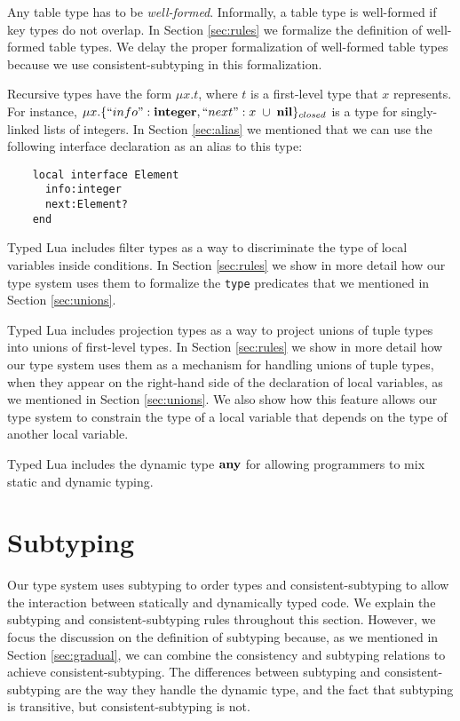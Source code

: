 Any table type has to be \emph{well-formed}.
Informally, a table type is well-formed if key types do not overlap.
In Section \ref{sec:rules} we formalize the definition of well-formed table types.
We delay the proper formalization of well-formed table types because we use
consistent-subtyping in this formalization.

Recursive types have the form $\mu x.t$,
where $t$ is a first-level type that $x$ represents.
For instance, $\mu x.\{``info":\mathbf{integer}, ``next":x \;\cup\; \mathbf{nil}\}_{closed}$
is a type for singly-linked lists of integers.
In Section \ref{sec:alias} we mentioned that we can use the following
interface declaration as an alias to this type:
\begin{verbatim}
    local interface Element
      info:integer
      next:Element?
    end
\end{verbatim}

Typed Lua includes filter types as a way to discriminate the type of local
variables inside conditions.
In Section \ref{sec:rules} we show in more detail how our type system
uses them to formalize the \texttt{type} predicates that we mentioned
in Section \ref{sec:unions}.

Typed Lua includes projection types as a way to project
unions of tuple types into unions of first-level types.
In Section \ref{sec:rules} we show in more detail how our type system
uses them as a mechanism for handling unions of tuple types,
when they appear on the right-hand side of the declaration of local variables,
as we mentioned in Section \ref{sec:unions}.
We also show how this feature allows our type system to constrain
the type of a local variable that depends on the type of another local variable.

Typed Lua includes the dynamic type $\mathbf{any}$ for allowing programmers
to mix static and dynamic typing.

\section{Subtyping}
\label{sec:subtyping}

Our type system uses subtyping \citep{cardelli1984smi,abadi1996to} to order
types and consistent-subtyping \citep{siek2007objects,siek2013mutable}
to allow the interaction between statically and dynamically typed code.
We explain the subtyping and consistent-subtyping rules throughout this section.
However, we focus the discussion on the definition of subtyping because,
as we mentioned in Section \ref{sec:gradual}, we can combine the
consistency and subtyping relations to achieve consistent-subtyping.
The differences between subtyping and consistent-subtyping are the way
they handle the dynamic type, and the fact that subtyping is transitive,
but consistent-subtyping is not.

